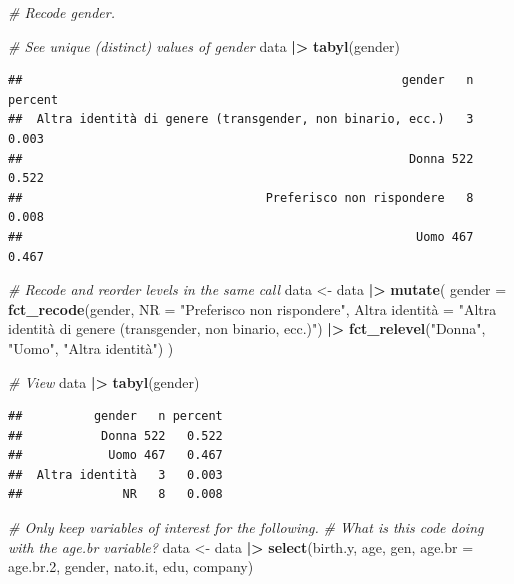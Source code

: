 \documentclass[
]{book}
\newenvironment{Shaded}{\begin{snugshade}}{\end{snugshade}}
\newcommand{\AttributeTok}[1]{\textcolor[rgb]{0.13,0.29,0.53}{#1}}
\newcommand{\CommentTok}[1]{\textcolor[rgb]{0.56,0.35,0.01}{\textit{#1}}}
\newcommand{\FloatTok}[1]{\textcolor[rgb]{0.00,0.00,0.81}{#1}}
\newcommand{\FunctionTok}[1]{\textcolor[rgb]{0.13,0.29,0.53}{\textbf{#1}}}
\newcommand{\NormalTok}[1]{#1}
\newcommand{\OtherTok}[1]{\textcolor[rgb]{0.56,0.35,0.01}{#1}}
\newcommand{\SpecialCharTok}[1]{\textcolor[rgb]{0.81,0.36,0.00}{\textbf{#1}}}
\newcommand{\StringTok}[1]{\textcolor[rgb]{0.31,0.60,0.02}{#1}}
\begin{document}
\begin{Shaded}
\begin{Highlighting}[]
\CommentTok{\# Recode gender.}

\CommentTok{\# See unique (distinct) values of gender}
\NormalTok{data }\SpecialCharTok{|\textgreater{}} 
  \FunctionTok{tabyl}\NormalTok{(gender)}
\end{Highlighting}
\end{Shaded}

\begin{verbatim}
##                                                     gender   n percent
##  Altra identità di genere (transgender, non binario, ecc.)   3   0.003
##                                                      Donna 522   0.522
##                                  Preferisco non rispondere   8   0.008
##                                                       Uomo 467   0.467
\end{verbatim}

\begin{Shaded}
\begin{Highlighting}[]
\CommentTok{\# Recode and reorder levels in the same call}
\NormalTok{data }\OtherTok{\textless{}{-}}\NormalTok{ data }\SpecialCharTok{|\textgreater{}} 
  \FunctionTok{mutate}\NormalTok{(}
    \AttributeTok{gender =} \FunctionTok{fct\_recode}\NormalTok{(gender, }
                        \AttributeTok{NR =} \StringTok{"Preferisco non rispondere"}\NormalTok{,}
                        \StringTok{\textasciigrave{}}\AttributeTok{Altra identità}\StringTok{\textasciigrave{}} \OtherTok{=} \StringTok{"Altra identità di genere (transgender, non binario, ecc.)"}\NormalTok{) }\SpecialCharTok{|\textgreater{}} 
      \FunctionTok{fct\_relevel}\NormalTok{(}\StringTok{"Donna"}\NormalTok{, }\StringTok{"Uomo"}\NormalTok{, }\StringTok{"Altra identità"}\NormalTok{)}
\NormalTok{  )}

\CommentTok{\# View}
\NormalTok{data }\SpecialCharTok{|\textgreater{}} 
  \FunctionTok{tabyl}\NormalTok{(gender)}
\end{Highlighting}
\end{Shaded}

\begin{verbatim}
##          gender   n percent
##           Donna 522   0.522
##            Uomo 467   0.467
##  Altra identità   3   0.003
##              NR   8   0.008
\end{verbatim}

\begin{Shaded}
\begin{Highlighting}[]
\CommentTok{\# Only keep variables of interest for the following.}
\CommentTok{\# What is this code doing with the age.br variable?}
\NormalTok{data }\OtherTok{\textless{}{-}}\NormalTok{ data }\SpecialCharTok{|\textgreater{}} 
  \FunctionTok{select}\NormalTok{(birth.y, age, gen, }\AttributeTok{age.br =}\NormalTok{ age.br}\FloatTok{.2}\NormalTok{, gender, nato.it, edu, company)}
\end{Highlighting}
\end{Shaded}
\end{document}
